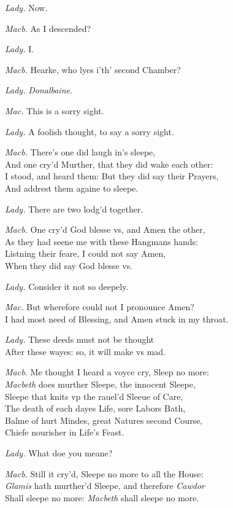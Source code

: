 \documentclass[12pt]{sides}
\newcommand{\dia}[1]{\hskip 15pt\textit{#1}\hskip 6pt}
\begin{document}
\begin{multicols}{2}
            \dia{Lady.} Now.

            \dia{Macb.} As I descended?

            \dia{Lady.} I.

            \dia{Macb.} Hearke, who lyes i'th' second Chamber?

            \dia{Lady.} \textit{Donalbaine}.

            \dia{Mac.} This is a sorry sight.

            \dia{Lady.} A foolish thought, to say a sorry sight.

            \dia{Macb.} There's one did laugh in's sleepe, \\ And one cry'd Murther, that they did wake each other: \\ I stood, and heard them: But they did say their Prayers, \\ And addrest them againe to sleepe.

            \dia{Lady.} There are two lodg'd together.

            \dia{Macb.} One cry'd God blesse vs, and Amen the other, \\ As they had seene me with these Hangmans hands: \\ Listning their feare, I could not say Amen, \\ When they did say God blesse vs.

            \dia{Lady.} Consider it not so deepely.

            \dia{Mac.} But wherefore could not I pronounce Amen? \\ I had most need of Blessing, and Amen stuck in my throat.

            \dia{Lady.} These deeds must not be thought \\ After these wayes: so, it will make vs mad.

            \dia{Macb.} Me thought I heard a voyce cry, Sleep no more: \\ \textit{Macbeth} does murther Sleepe, the innocent Sleepe, \\ Sleepe that knits vp the rauel'd Sleeue of Care, \\ The death of each dayes Life, sore Labors Bath, \\ Balme of hurt Mindes, great Natures second Course, \\ Chiefe nourisher in Life's Feast.

            \dia{Lady.} What doe you meane?

            \dia{Macb.} Still it cry'd, Sleepe no more to all the House: \\ \textit{Glamis} hath murther'd Sleepe, and therefore \textit{Cawdor} \\ Shall sleepe no more: \dia{Macbeth} shall sleepe no more.


\end{multicols}
\end{document}
